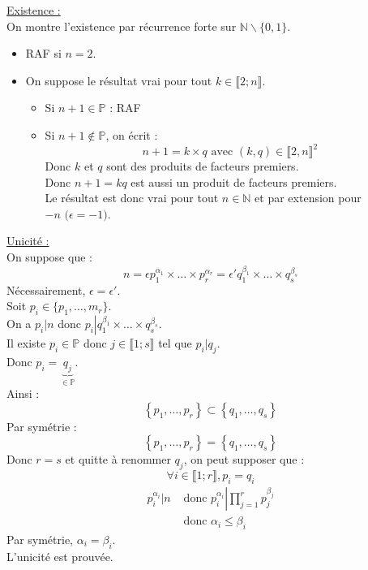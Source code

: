 \documentclass[../main.tex]{subfiles}
\begin{document}
\noindent \underline{Existence :} \\
On montre l'existence par récurrence forte sur $\mathbb{N} \backslash \{ 0, 1 \}$. 
\begin{itemize}
    \item RAF si $n = 2$. 
    \item On suppose le résultat vrai pour tout $k \in \llbracket 2 ; n \rrbracket$. \\
    \begin{itemize}
        \item Si $n + 1 \in \mathbb{P}$ : RAF
        \item Si $n + 1 \not \in \mathbb{P}$, on écrit : 
        $$n + 1 = k \times q \text{ avec $(k, q) \in \llbracket 2, n \rrbracket^2$}$$
        Donc $k$ et $q$ sont des produits de facteurs premiers. \\
        Donc $n+1 = kq$ est aussi un produit de facteurs premiers. \\
        Le résultat est donc vrai pour tout $n \in \mathbb{N}$ et par extension pour $-n \text{ ($\epsilon = -1$)}$. 
    \end{itemize}
\end{itemize}

\noindent \underline{Unicité :} \\
On suppose que : 
$$n = \epsilon p_1^{\alpha_1} \times \dots \times p_r^{\alpha_r} = \epsilon' q_1^{\beta_1} \times \dots \times q_s^{\beta_s}$$
Nécessairement, $\epsilon = \epsilon'$. \\
Soit $p_i \in \{ p_1, \ldots, m_r \}$. \\
On a $p_i | n$ donc $p_i \left| q_1^{\beta_1} \times \dots \times q_s^{\beta_s} \right.$. \\
Il existe $p_i \in \mathbb{P}$ donc $j \in \llbracket 1 ; s \rrbracket$ tel que $p_i | q_j$. \\
Donc $p_i = \underbrace{q_j}_{\in \mathbb{P}}$. \\
Ainsi : 
$$\left\{ p_1, \ldots, p_r \right\} \subset \left\{ q_1, \ldots, q_s \right\}$$
Par symétrie : 
$$\left\{ p_1, \ldots, p_r \right\} = \left\{ q_1, \ldots, q_s \right\}$$
Donc $r = s$ et quitte à renommer $q_j$, on peut supposer que : \\
$$\forall i \in \llbracket 1 ; r \rrbracket, p_i = q_i$$
\begin{align*}
    p_i^{\alpha_i} \left | n \right. &\text{ donc } p_i^{\alpha_i} \left | \prod_{j = 1}^{r} p_j^{\beta_j} \right. \\
&\text{ donc } \alpha_i \leq \beta_i
\end{align*}
Par symétrie, $\alpha_i = \beta_i$. \\
L'unicité est prouvée. 
\end{document}
